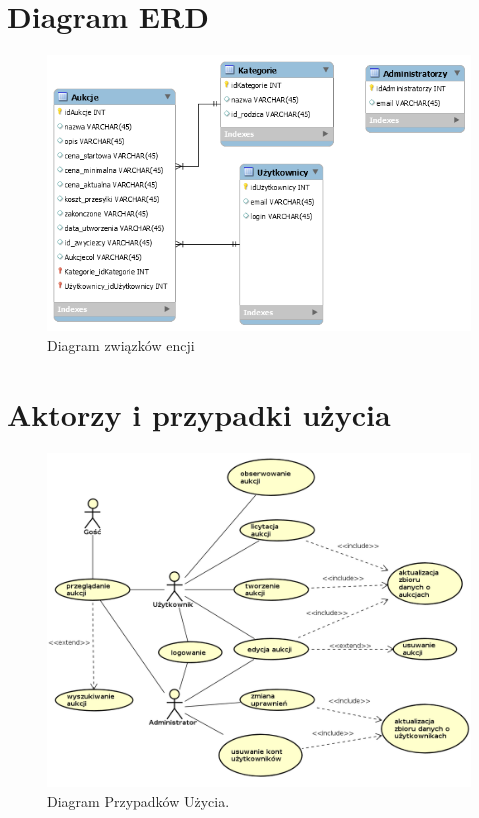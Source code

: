 \documentclass[brudnopis]{xmgr}
\begin{document}
\section{Diagram ERD}

\begin{figure}[!tbh]
\centering
\includegraphics[width=.8\linewidth]{erd}
\caption{Diagram związków encji\label{RYS.1}}
\end{figure}

\newpage

\section{Aktorzy i przypadki użycia}
\begin{figure}[!tbh]
\centering
\includegraphics[width=.9\linewidth]{fig/ucdiagram}
\caption{Diagram Przypadków Użycia.}
\end{figure}
\end{document}
